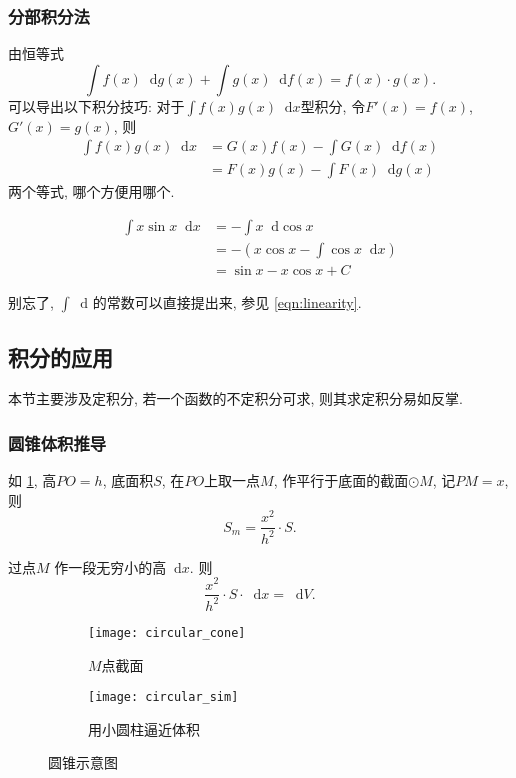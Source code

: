 \documentclass[UTF8]{mathrep}
\newcommand*{\dif}{\mathop{}\!\mathrm{d}}
\begin{document}
\subsubsection*{分部积分法}
由恒等式
\[
  \int f(x)\dif g(x) + \int g(x) \dif f(x) = f(x)\cdot g(x)
.\]
可以导出以下积分技巧:
对于$\int f(x)g(x) \dif x$型积分, 令$F'(x) = f(x)$, $G'(x) = g(x)$, 则
\begin{align*}
  \int f(x)g(x) \dif x & = G(x)f(x) - \int G(x) \dif f(x) \\
  & = F(x)g(x) - \int F(x) \dif g(x)
\end{align*}
两个等式, 哪个方便用哪个.

\begin{example}
  \begin{align*}
    \int x \sin x\dif x & = - \int x \dif \cos x                          \\
    & = -\left(x \cos x - \int  \cos x \dif x \right) \\
    & = \sin x - x \cos x +C
  \end{align*}
\end{example}
别忘了, $\int \dif$  的常数可以直接提出来, 参见 \cref{eqn:linearity}.

\subsection{积分的应用}
本节主要涉及定积分, 若一个函数的不定积分可求, 则其求定积分易如反掌.

\subsubsection{圆锥体积推导}

如 \cref{fig:circular_cone}, 高$PO = h$, 底面积$S$, 在$PO$上取一点$M$,
作平行于底面的截面$\odot M$, 记$PM = x$, 则
\[
  S_m = \frac{x^{2}}{h^{2} } \cdot S
.\]

过点$M$ 作一段无穷小的高$\dif x$.
则
\[
  \frac{x^{2}}{h^{2} }\cdot S \cdot \dif x = \dif V
.\]

\begin{figure}[!htbp]
  \begin{center}
    \begin{subfigure}{0.45\textwidth}
      \centering
      \texttt{[image: circular\_cone]}
      \caption{$M$点截面}\label{fig:circular_cone}
    \end{subfigure}
    \begin{subfigure}{0.45\textwidth}
      \centering
      \texttt{[image: circular\_sim]}
      \caption{用小圆柱逼近体积}\label{fig:circular_sim}
    \end{subfigure}
    \caption{圆锥示意图}
  \end{center}
\end{figure}
\end{document}
